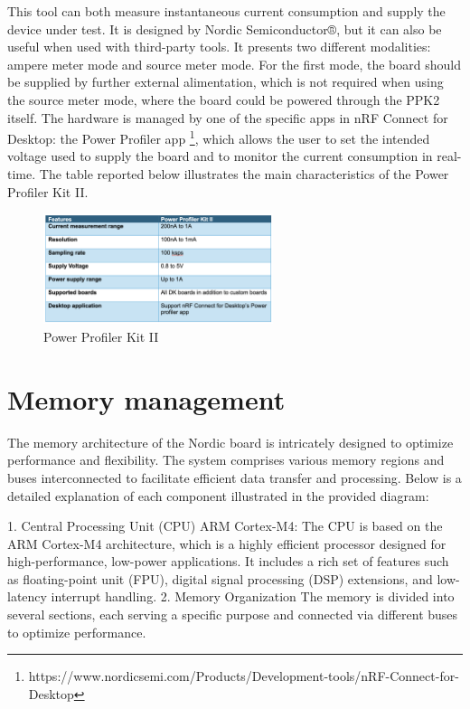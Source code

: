 \documentclass{Configuration_Files/PoliMi3i_thesis}
\begin{document}
This tool can both measure instantaneous current consumption and supply the device under test. It is designed by Nordic Semiconductor®, but it can also be useful when used with third-party tools. It presents two different modalities: ampere meter mode and source meter mode. For the first mode, the board should be supplied by further external alimentation, which is not required when using the source meter mode, where the board could be powered through the PPK2 itself. The hardware is managed by one of the specific apps in nRF Connect for Desktop: the Power Profiler app \footnote{https://www.nordicsemi.com/Products/Development-tools/nRF-Connect-for-Desktop}, which allows the user to set the intended voltage used to supply the board and to monitor the current consumption in real-time. The table reported below illustrates the main characteristics of the Power Profiler Kit II.

\begin{figure}[h!]
    \centering
    \includegraphics[width=0.6\textwidth]{Materials/figure5}
    \caption{Power Profiler Kit II}
\end{figure}


\section{Memory management}

The memory architecture of the Nordic board is intricately designed to optimize performance and flexibility. The system comprises various memory regions and buses interconnected to facilitate efficient data transfer and processing. Below is a detailed explanation of each component illustrated in the provided diagram:

1. Central Processing Unit (CPU)
ARM Cortex-M4: The CPU is based on the ARM Cortex-M4 architecture, which is a highly efficient processor designed for high-performance, low-power applications. It includes a rich set of features such as floating-point unit (FPU), digital signal processing (DSP) extensions, and low-latency interrupt handling.
2. Memory Organization
The memory is divided into several sections, each serving a specific purpose and connected via different buses to optimize performance.
\end{document}
